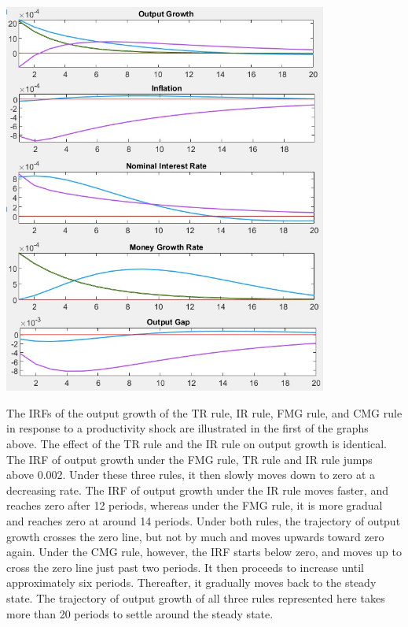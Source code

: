 \documentclass[11pt,preprint, authoryear]{elsarticle}
\let\origfigure\figure
\let\endorigfigure\endfigure
\renewenvironment{figure}[1][2] {
    \expandafter\origfigure\expandafter[H]
} {
    \endorigfigure
}
\numberwithin{equation}{section}
\numberwithin{figure}{section}
\numberwithin{table}{section}
\begin{document}
\begin{figure}
\centering
\includegraphics[width=0.8\textwidth,height=0.6\textheight]{./figures/productivity-shock.jpeg}
\caption{Plots of Impulse Response Functions for a Productivity Shock}
\end{figure}

The IRFs of the output growth of the TR rule, IR rule, FMG rule, and CMG
rule in response to a productivity shock are illustrated in the first of
the graphs above. The effect of the TR rule and the IR rule on output
growth is identical. The IRF of output growth under the FMG rule, TR
rule and IR rule jumps above 0.002. Under these three rules, it then
slowly moves down to zero at a decreasing rate. The IRF of output growth
under the IR rule moves faster, and reaches zero after 12 periods,
whereas under the FMG rule, it is more gradual and reaches zero at
around 14 periods. Under both rules, the trajectory of output growth
crosses the zero line, but not by much and moves upwards toward zero
again. Under the CMG rule, however, the IRF starts below zero, and moves
up to cross the zero line just past two periods. It then proceeds to
increase until approximately six periods. Thereafter, it gradually moves
back to the steady state. The trajectory of output growth of all three
rules represented here takes more than 20 periods to settle around the
steady state.
\end{document}

